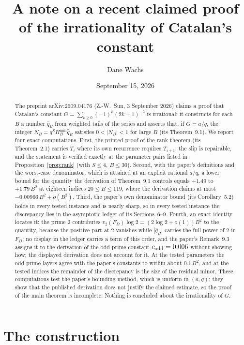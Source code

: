 \documentclass[11pt]{amsart}
\title[A claimed proof of the irrationality of Catalan's constant]{A note on a recent claimed proof\\ of the irrationality of Catalan's constant}
\author{Dane Wachs}
\date{September 15, 2026}
\theoremstyle{definition}
\newcommand{\qhat}{\widehat{q}}
\begin{document}
\begin{abstract}
The preprint arXiv:2609.04176 (Z.-W.~Sun, 3 September 2026) claims a proof that Catalan's constant
$G=\sum_{k\ge0}(-1)^k(2k+1)^{-2}$ is irrational: it constructs for each $B$ a number $\qhat_B$ from weighted
tails of the series and asserts that, if $G=a/q$, the integer $N_B=q^SH_B^{\min}\qhat_B$ satisfies $0<|N_B|<1$
for large $B$ (its Theorem~9.1). We report four exact computations. First, the printed proof of the rank
theorem (its Theorem~2.1) carries $T_i$ where its own recurrence requires $T_{i+1}$; the slip is repairable, and the statement is verified exactly at the parameter pairs listed in Proposition~\ref{prop:rank} (with $S\le4$, $B\le30$). Second, with the paper's definitions and the worst-case
denominator, which is attained at an explicit rational $a/q$, a lower bound for the quantity the derivation of Theorem~9.1 controls equals $+1.49$ to $+1.79\,B^2$ at eighteen indices $20\le B\le119$, where the derivation claims at most $-0.00966\,B^2+o(B^2)$.
Third, the paper's own denominator bound (its Corollary~5.2) holds in every tested instance and is nearly sharp,
so in every tested instance the discrepancy lies in the asymptotic ledger of its Sections~6--9. Fourth, an exact identity locates it: the
prime $2$ contributes $v_2(F_D)\log2=(2\log2+o(1))B^2$ to the quantity, because the positive part at $2$ vanishes
while $|\qhat_B|$ carries the full power of $2$ in $F_D$; no display in the ledger carries a term of this order, and
the paper's Remark~9.3 assigns it to the derivation of the odd-prime constant $c_{\rm odd}=0.006$ without showing how; the displayed derivation does not account for it. At the tested parameters the odd-prime layers agree with the paper's
constants to within about $0.1\,B^2$, and at the tested indices the remainder of the discrepancy is the size of the residual minor. These computations test the paper's bounding method, which is uniform in $(a,q)$; they show that the
published derivation does not justify the claimed estimate, so the proof of the main theorem is incomplete.
Nothing is concluded about the irrationality of $G$.
\end{abstract}

\maketitle

\section{The construction}
\end{document}
